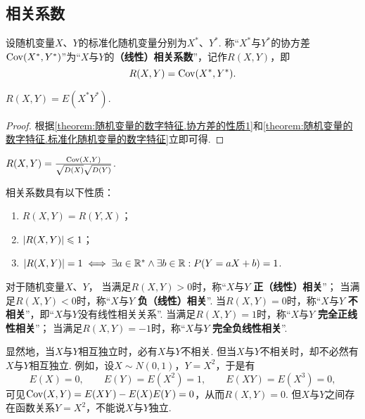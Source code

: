 \subsection{相关系数}
\begin{definition}\label{definition:随机变量的数字特征.相关系数}
设随机变量\(X\)、\(Y\)的标准化随机变量分别为\(X^*\)、\(Y^*\).
称“\(X^*\)与\(Y^*\)的协方差\(\operatorname{Cov}(X^*,Y^*)\)”为“\(X\)与\(Y\)的\textbf{（线性）相关系数}”，记作\(R(X,Y)\)，即\[
R(X,Y) = \operatorname{Cov}(X^*,Y^*).
\]
\end{definition}

\begin{theorem}\label{theorem:随机变量的数字特征.相关系数的性质1}
\(R(X,Y)=E(X^* Y^*)\).
\begin{proof}
根据\cref{theorem:随机变量的数字特征.协方差的性质1}和\cref{theorem:随机变量的数字特征.标准化随机变量的数字特征}立即可得.
\end{proof}
\end{theorem}

\begin{theorem}\label{theorem:随机变量的数字特征.相关系数的性质2}
\(R(X,Y)=\frac{\operatorname{Cov}(X,Y)}{\sqrt{D(X)} \sqrt{D(Y)}}\).
\end{theorem}

\begin{property}
相关系数具有以下性质：
\begin{enumerate}
\item \(R(X,Y)=R(Y,X)\)；
\item \(\abs{R(X,Y)} \leqslant 1\)；
\item \(\abs{R(X,Y)}=1 \iff \exists a \in \mathbb{R}^* \land \exists b \in \mathbb{R} : P(Y=aX+b)=1\).
\end{enumerate}
\end{property}

\begin{definition}
对于随机变量\(X\)、\(Y\)，%
当满足\(R(X,Y)>0\)时，称“\(X\)与\(Y\) \textbf{正（线性）相关}”；
当满足\(R(X,Y)<0\)时，称“\(X\)与\(Y\) \textbf{负（线性）相关}”.
当\(R(X,Y)=0\)时，称“\(X\)与\(Y\) \textbf{不相关}”，即“\(X\)与\(Y\)没有线性相关关系”.
当满足\(R(X,Y)=1\)时，称“\(X\)与\(Y\) \textbf{完全正线性相关}”；
当满足\(R(X,Y)=-1\)时，称“\(X\)与\(Y\) \textbf{完全负线性相关}”.
\end{definition}

显然地，当\(X\)与\(Y\)相互独立时，必有\(X\)与\(Y\)不相关.
但当\(X\)与\(Y\)不相关时，却不必然有\(X\)与\(Y\)相互独立.
例如，设\(X \sim N(0,1)\)，\(Y=X^2\)，于是有\[
E(X) = 0,
\qquad
E(Y) = E(X^2) = 1,
\qquad
E(XY) = E(X^3) = 0,
\]
可见\(\operatorname{Cov}(X,Y) = E(XY) - E(X) E(Y) = 0\)，从而\(R(X,Y) = 0\).
但\(X\)与\(Y\)之间存在函数关系\(Y=X^2\)，不能说\(X\)与\(Y\)独立.
